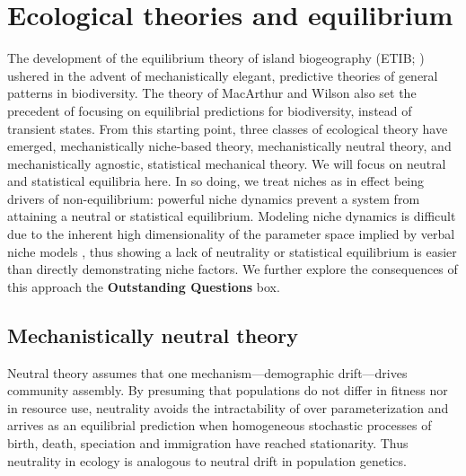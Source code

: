 \documentclass[12pt]{article}
\begin{document}

\section{Ecological theories and equilibrium}

The development of the equilibrium theory of island biogeography
(ETIB; \citep{MacArthur1967-ux}) ushered in the advent of
mechanistically elegant, predictive theories of general patterns in
biodiversity. The theory of MacArthur and Wilson also set the
precedent of focusing on equilibrial predictions for biodiversity,
instead of transient states. From this starting point, three classes
of ecological theory have emerged, mechanistically niche-based theory,
mechanistically neutral theory, and mechanistically agnostic,
statistical mechanical theory. We will focus on neutral and
statistical equilibria here. In so doing, we treat niches as in effect
being drivers of non-equilibrium: powerful niche dynamics prevent a
system from attaining a neutral or statistical equilibrium.  Modeling
niche dynamics is difficult due to the inherent high dimensionality of
the parameter space implied by verbal niche models
\citep[e.g.,][]{hutch}, thus showing a lack of neutrality or
statistical equilibrium is easier than directly demonstrating niche
factors. We further explore the consequences of this approach the {\bf
  Outstanding Questions} box.

% 

\subsection{Mechanistically neutral theory}

Neutral theory \citep{Hubbell2001-dx} assumes that one
mechanism---demographic drift---drives community assembly. By
presuming that populations do not differ in fitness nor in resource
use, neutrality avoids the intractability of over parameterization and
arrives as an equilibrial prediction when homogeneous stochastic
processes of birth, death, speciation and immigration have reached
stationarity. Thus neutrality in ecology is analogous to neutral drift
in population genetics.
\end{document}
